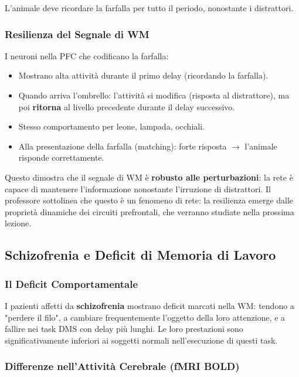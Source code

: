 L'animale deve ricordare la farfalla per tutto il periodo, nonostante i distrattori.

\subsubsection{Resilienza del Segnale di WM}

I neuroni nella PFC che codificano la farfalla:
\begin{itemize}
    \item Mostrano alta attività durante il primo delay (ricordando la farfalla).
    \item Quando arriva l'ombrello: l'attività si modifica (risposta al distrattore), ma poi \textbf{ritorna} al livello precedente durante il delay successivo.
    \item Stesso comportamento per leone, lampada, occhiali.
    \item Alla presentazione della farfalla (matching): forte risposta $\rightarrow$ l'animale risponde correttamente.
\end{itemize}

Questo dimostra che il segnale di WM è \textbf{robusto alle perturbazioni}: la rete è capace di mantenere l'informazione nonostante l'irruzione di distrattori. Il professore sottolinea che questo è un fenomeno di rete: la resilienza emerge dalle proprietà dinamiche dei circuiti prefrontali, che verranno studiate nella prossima lezione.


\subsection{Schizofrenia e Deficit di Memoria di Lavoro}

\subsubsection{Il Deficit Comportamentale}

I pazienti affetti da \textbf{schizofrenia} mostrano deficit marcati nella WM: tendono a "perdere il filo", a cambiare frequentemente l'oggetto della loro attenzione, e a fallire nei task DMS con delay più lunghi. Le loro prestazioni sono significativamente inferiori ai soggetti normali nell'esecuzione di questi task.

\subsubsection{Differenze nell'Attività Cerebrale (fMRI BOLD)}

